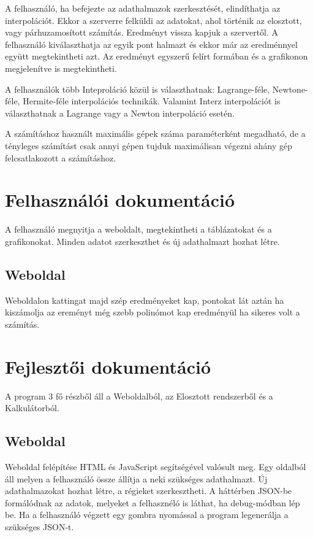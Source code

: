 \documentclass{elteikthesis}
\begin{document}
A felhasználó, ha befejezte az adathalmazok szerkesztését, elindíthatja az interpolációt. Ekkor a szerverre felküldi az adatokat, ahol történik az elosztott, vagy párhuzamosított számítás. Eredményt vissza kapjuk a szervertől.
A felhasználó kiválaszthatja az egyik pont halmazt és ekkor már az eredménnyel együtt megtekintheti azt.
Az eredményt egyszerű felírt formában és a grafikonon megjelenítve is megtekintheti. 

A felhasználók több Inteproláció közül is választhatnak: Lagrange-féle, Newtone-féle, Hermite-féle interpolációs technikák.
Valamint Interz interpolációt is választhatnak a Lagrange vagy a Newton interpoláció esetén.

A számításhoz használt maximális gépek száma paraméterként megadható, de a tényleges számítást csak annyi gépen tujduk maximálisan végezni ahány gép felcsatlakozott a számításhoz. 

\chapter{Felhasználói dokumentáció}
A felhasználó megnyitja a weboldalt, megtekintheti a táblázatokat és a grafikonokat. Minden adatot szerkeszthet és új adathalmazt hozhat létre.

\section{Weboldal}
Weboldalon kattingat majd szép eredményeket kap, pontokat lát aztán ha kiszámolja az ereményt még szebb polinómot kap eredményül ha sikeres volt a számítás.

\chapter{Fejlesztői dokumentáció}
A program 3 fő részből áll a Weboldalból, az Elosztott rendszerből és a Kalkulátorból.

\section{Weboldal}
Weboldal felépítése HTML és JavaScript segítségével valósult meg. Egy oldalból áll melyen a felhasználó össze állítja a neki szükséges adathalmazt. Új adathalmazokat hozhat létre, a régieket szerkesztheti. A háttérben JSON-be formálódnak az adatok, melyeket a felhasznéló is láthat, ha debug-módban lép be. 
Ha a felhasználó végzett egy gombra nyomással a program legenerálja a szükséges JSON-t. 
\end{document}
